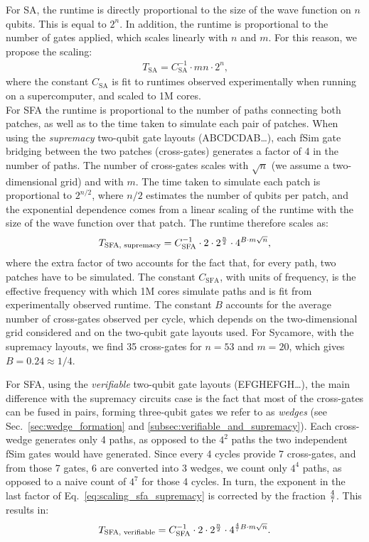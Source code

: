 For SA, the runtime is directly proportional to the size of the wave function on $n$ qubits. This is equal to $2^n$. In addition, the runtime is proportional to the number of gates applied, which scales linearly with $n$ and $m$. For this reason, we propose the scaling:
\begin{align}
\label{eq:scaling_sa}
    T_{\text{SA}} = C_{\text{SA}}^{-1} \cdot m n \cdot 2^{n} \text{,}
\end{align}
where the constant $C_{\text{SA}}$ is fit to runtimes observed experimentally when running on a supercomputer, and scaled to 1M cores.
\\

For SFA the runtime is proportional to the number of paths connecting both patches, as well as to the time taken to simulate each pair of patches. When using the \emph{supremacy} two-qubit gate layouts (ABCDCDAB\ldots), each {\rm fSim} gate bridging between the two patches (cross-gates) generates a factor of 4 in the number of paths. The number of cross-gates scales with $\sqrt{n}$ (we assume a two-dimensional grid) and with $m$. The time taken to simulate each patch is proportional to $2^{n/2}$, where $n/2$ estimates the number of qubits per patch, and the exponential dependence comes from a linear scaling of the runtime with the size of the wave function over that patch. The runtime therefore scales as:
\begin{align}
\label{eq:scaling_sfa_supremacy}
    T_{\text{SFA, supremacy}} = C_{\text{SFA}}^{-1} \cdot 2 \cdot 2^{n \over 2} \cdot 4^{B \cdot m \sqrt{n}} \text{,}
\end{align}
where the extra factor of two accounts for the fact that, for every path, two patches have to be simulated. The constant $C_{\text{SFA}}$, with units of frequency, is the effective frequency with which 1M cores simulate paths and is fit from experimentally observed runtime. The constant $B$ accounts for the average number of cross-gates observed per cycle, which depends on the two-dimensional grid considered and on the two-qubit gate layouts used. For Sycamore, with the supremacy layouts, we find 35 cross-gates for $n=53$ and $m=20$, which gives $B=0.24\approx 1/4$.

For SFA, using the \emph{verifiable} two-qubit gate layouts (EFGHEFGH\ldots), the main difference with the supremacy circuits case is the fact that most of the cross-gates can be fused in pairs, forming three-qubit gates we refer to as \emph{wedges} (see Sec.~\ref{sec:wedge_formation} and \ref{subsec:verifiable_and_supremacy}). Each cross-wedge generates only 4 paths, as opposed to the $4^2$ paths the two independent {\rm fSim} gates would have generated. Since every 4 cycles provide 7 cross-gates, and from those 7 gates, 6 are converted into 3 wedges, we count only $4^4$ paths, as opposed to a naive count of $4^7$ for those 4 cycles. In turn, the exponent in the last factor of Eq.~\ref{eq:scaling_sfa_supremacy} is corrected by the fraction $4 \over 7$. This results in:
\begin{align}
\label{eq:scaling_sfa_verifiable}
    T_{\text{SFA, verifiable}} = C_{\text{SFA}}^{-1} \cdot 2 \cdot 2^{n \over 2} \cdot 4^{{4\over 7} B \cdot m \sqrt{n}} \text{.}
\end{align}


